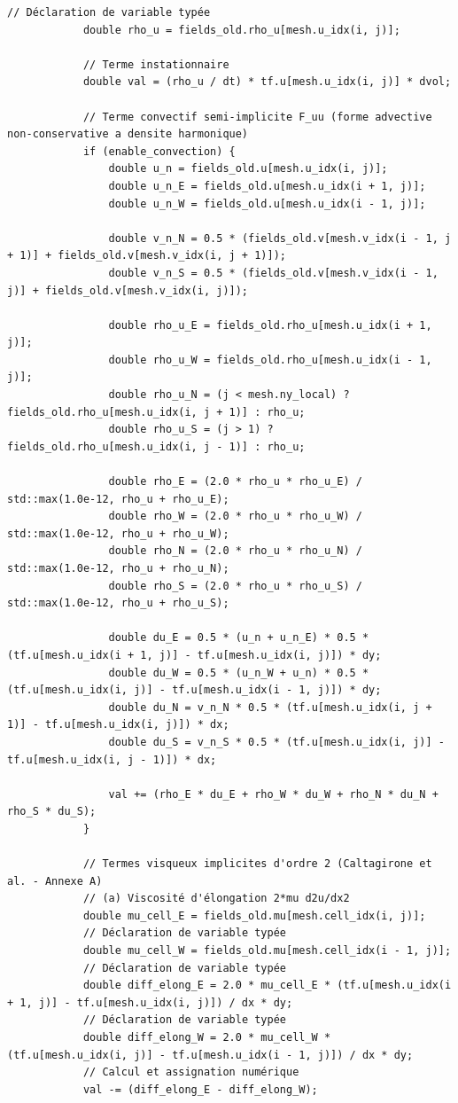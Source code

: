 \documentclass[10pt,a4paper,oneside]{book}
\begin{document}
\begin{lstlisting}[language={[11]C++}]
            // Déclaration de variable typée
            double rho_u = fields_old.rho_u[mesh.u_idx(i, j)];

            // Terme instationnaire
            double val = (rho_u / dt) * tf.u[mesh.u_idx(i, j)] * dvol;

            // Terme convectif semi-implicite F_uu (forme advective non-conservative a densite harmonique)
            if (enable_convection) {
                double u_n = fields_old.u[mesh.u_idx(i, j)];
                double u_n_E = fields_old.u[mesh.u_idx(i + 1, j)];
                double u_n_W = fields_old.u[mesh.u_idx(i - 1, j)];

                double v_n_N = 0.5 * (fields_old.v[mesh.v_idx(i - 1, j + 1)] + fields_old.v[mesh.v_idx(i, j + 1)]);
                double v_n_S = 0.5 * (fields_old.v[mesh.v_idx(i - 1, j)] + fields_old.v[mesh.v_idx(i, j)]);

                double rho_u_E = fields_old.rho_u[mesh.u_idx(i + 1, j)];
                double rho_u_W = fields_old.rho_u[mesh.u_idx(i - 1, j)];
                double rho_u_N = (j < mesh.ny_local) ? fields_old.rho_u[mesh.u_idx(i, j + 1)] : rho_u;
                double rho_u_S = (j > 1) ? fields_old.rho_u[mesh.u_idx(i, j - 1)] : rho_u;

                double rho_E = (2.0 * rho_u * rho_u_E) / std::max(1.0e-12, rho_u + rho_u_E);
                double rho_W = (2.0 * rho_u * rho_u_W) / std::max(1.0e-12, rho_u + rho_u_W);
                double rho_N = (2.0 * rho_u * rho_u_N) / std::max(1.0e-12, rho_u + rho_u_N);
                double rho_S = (2.0 * rho_u * rho_u_S) / std::max(1.0e-12, rho_u + rho_u_S);

                double du_E = 0.5 * (u_n + u_n_E) * 0.5 * (tf.u[mesh.u_idx(i + 1, j)] - tf.u[mesh.u_idx(i, j)]) * dy;
                double du_W = 0.5 * (u_n_W + u_n) * 0.5 * (tf.u[mesh.u_idx(i, j)] - tf.u[mesh.u_idx(i - 1, j)]) * dy;
                double du_N = v_n_N * 0.5 * (tf.u[mesh.u_idx(i, j + 1)] - tf.u[mesh.u_idx(i, j)]) * dx;
                double du_S = v_n_S * 0.5 * (tf.u[mesh.u_idx(i, j)] - tf.u[mesh.u_idx(i, j - 1)]) * dx;

                val += (rho_E * du_E + rho_W * du_W + rho_N * du_N + rho_S * du_S);
            }

            // Termes visqueux implicites d'ordre 2 (Caltagirone et al. - Annexe A)
            // (a) Viscosité d'élongation 2*mu d2u/dx2
            double mu_cell_E = fields_old.mu[mesh.cell_idx(i, j)];
            // Déclaration de variable typée
            double mu_cell_W = fields_old.mu[mesh.cell_idx(i - 1, j)];
            // Déclaration de variable typée
            double diff_elong_E = 2.0 * mu_cell_E * (tf.u[mesh.u_idx(i + 1, j)] - tf.u[mesh.u_idx(i, j)]) / dx * dy;
            // Déclaration de variable typée
            double diff_elong_W = 2.0 * mu_cell_W * (tf.u[mesh.u_idx(i, j)] - tf.u[mesh.u_idx(i - 1, j)]) / dx * dy;
            // Calcul et assignation numérique
            val -= (diff_elong_E - diff_elong_W);


\end{lstlisting}
\end{document}
